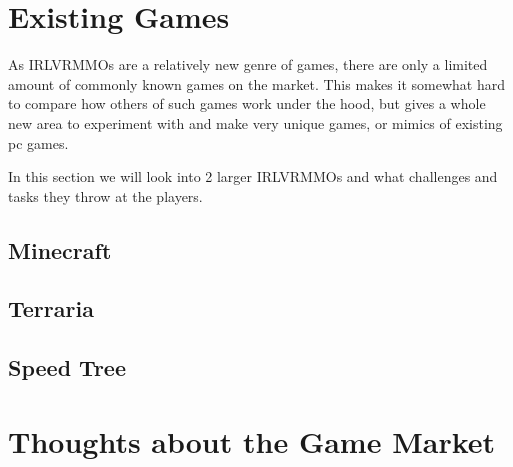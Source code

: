\section{Existing Games}

As IRLVRMMOs are a relatively new genre of games, there are only a limited amount of commonly known games on the market. This makes it somewhat hard to compare how others of such games work under the hood, but gives a whole new area to experiment with and make very unique games, or mimics of existing pc games.

In this section we will look into 2 larger IRLVRMMOs and what challenges and tasks they throw at the players.


\subsection{Minecraft}

\subsection{Terraria}

\subsection{Speed Tree}

\section{Thoughts about the Game Market}
